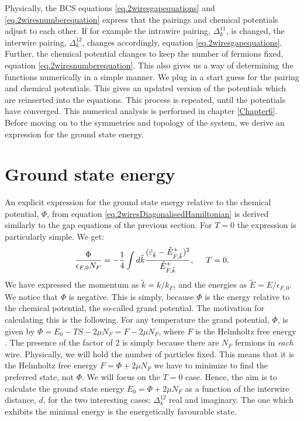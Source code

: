 Physically, the BCS equations \eqref{eq.2wiresgapequations} and \eqref{eq.2wiresnumberequation} express that the pairings and chemical potentials adjust to each other. If for example the intrawire pairing, $\Delta^{11}_k$, is changed, the interwire pairing, $\Delta^{12}_k$, changes accordingly, equation \eqref{eq.2wiresgapequations}. Further, the chemical potential changes to keep the number of fermions fixed, equation \eqref{eq.2wiresnumberequation}. This also gives us a way of determining the functions numerically in a simple manner. We plug in a start guess for the pairing and chemical potentials. This gives an updated version of the potentials which are reinserted into the equations. This process is repeated, until the potentials have converged. This numerical analysis is performed in chapter \ref{Chapter6}. Before moving on to the symmetries and topology of the system, we derive an expression for the ground state energy.

\section{Ground state energy} \label{sec.groundstateenergy}
An explicit expression for the ground state energy relative to the chemical potential, $\Phi$, from equation \eqref{eq.2wiresDiagonalisedHamiltonian} is derived similarly to the gap equations of the previous section. For $T = 0$ the expression is particularly simple. We get:
\begin{equation}
\frac{\Phi}{\epsilon_{F,0} N_F} = -\frac{1}{4} \int d\tilde{k} \frac{(\tilde{\varepsilon}_{\tilde{k}} - \tilde{E}^{+}_{F, \tilde{k}})^2}{\tilde{E}^{+}_{F, \tilde{k}}}, \hspace{0.5cm} T = 0. 
\label{eq.2wiresGrandGroundStateEnergy}
\end{equation}
We have expressed the momentum as $\tilde{k} = k / k_F$, and the energies as $\tilde{E} = E / \epsilon_{F,0}$. We notice that $\Phi$ is negative. This is simply, because $\Phi$ is the energy relative to the chemical potential, the so-called grand potential. The motivation for calculating this is the following. For any temperature the grand potential, $\Phi$, is given by $\Phi = E_0 - TS - 2\mu N_F = F - 2\mu N_F$, where $F$ is the Helmholtz free energy \cite[pp. 161-162]{SchroederThermal}. The presence of the factor of 2 is simply because there are $N_F$ fermions in \textit{each} wire. Physically, we will hold the number of particles fixed. This means that it is the Helmholtz free energy $F = \Phi + 2\mu N_F$ we have to minimize to find the preferred state, not $\Phi$. We will focus on the $T = 0$ case. Hence, the aim is to calculate the ground state energy $E_0 = \Phi + 2\mu N_F$ as a function of the interwire distance, $d$, for the two interesting cases: $\Delta^{12}_k$ real and imaginary. The one which exhibits the minimal energy is the energetically favourable state. 


